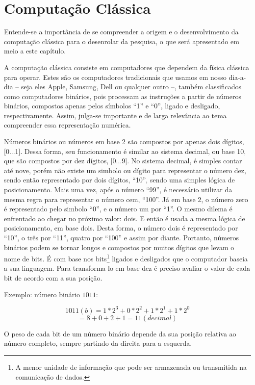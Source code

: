 \section{Computação Clássica} 
Entende-se a importância de se compreender a origem e o desenvolvimento da computação clássica para o desenrolar da pesquisa, o que será apresentado em meio a este capítulo.

A computação clássica consiste em computadores que dependem da física clássica para operar. Estes são os computadores tradicionais que usamos em nosso dia-a-dia – seja eles Apple, Samsung, Dell ou qualquer outro –, também classificados como computadores binários, pois processam as instruções a partir de números binários, compostos apenas pelos símbolos “1” e “0”, ligado e desligado, respectivamente. Assim, julga-se importante e de larga relevância ao tema compreender essa representação numérica. 

Números binários ou números em base 2 são compostos por apenas dois dígitos, [0...1]. Dessa forma, seu funcionamento é similar ao sistema decimal, ou base 10, que são compostos por dez dígitos, [0...9]. No sistema decimal, é simples contar até nove, porém não existe um simbolo ou dígito para representar o número dez, sendo então representado por dois dígitos, “10”, sendo uma simples lógica de posicionamento. Mais uma vez, após o número “99”, é necessário utilizar da mesma regra para representar o número cem, “100”. Já em base 2, o número zero é representado pelo simbolo ``0'', e o número um por ``1''. O mesmo dilema é enfrentado ao chegar no próximo valor: dois. E então é usada a mesma lógica de posicionamento, em base dois. Desta forma, o número dois é representado por “10”, o três por “11”, quatro por “100” e assim por diante. Portanto, números binários podem se tornar longos e compostos por muitos dígitos que levam o nome de bits. \cite{6} É com base nos \label{bits}bits\footnote{A menor unidade de informação que pode ser armazenada ou transmitida na comunicação de dados.} ligados e desligados que o computador baseia a sua linguagem. Para transforma-lo em base dez é preciso avaliar o valor de cada bit de acordo com a sua posição. 

Exemplo: número binário $1011$:

\[ 1011(b) = 1*2^3 + 0*2^2 + 1*2^1 + 1*2^0\]
\[ = 8 + 0 + 2 + 1 = 11(decimal)\]

O peso de cada bit de um número binário depende da sua posição relativa ao número completo, sempre partindo da direita para a esquerda.

